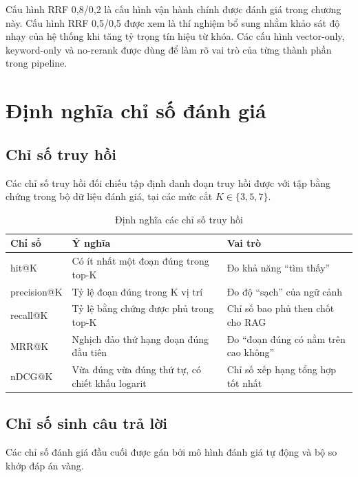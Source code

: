 \documentclass[../DoAn.tex]{subfiles}
\begin{document}
Cấu hình RRF 0,8/0,2 là cấu hình vận hành chính được đánh giá trong chương
này. Cấu hình RRF 0,5/0,5 được xem là thí nghiệm bổ sung nhằm khảo sát độ nhạy
của hệ thống khi tăng tỷ trọng tín hiệu từ khóa. Các cấu hình vector-only,
keyword-only và no-rerank được dùng để làm rõ vai trò của từng thành phần trong
pipeline.

\section{Định nghĩa chỉ số đánh giá}

\subsection{Chỉ số truy hồi}

Các chỉ số truy hồi đối chiếu tập định danh đoạn truy hồi được với tập bằng
chứng trong bộ dữ liệu đánh giá, tại các mức cắt $K \in \{3, 5, 7\}$.

\begin{table}[H]
\centering
\small
\begin{tabular}{|p{2.6cm}|p{4.8cm}|p{6.3cm}|}
\hline
\textbf{Chỉ số} & \textbf{Ý nghĩa} & \textbf{Vai trò} \\
\hline
hit@K & Có ít nhất một đoạn đúng trong top-K & Đo khả năng ``tìm thấy'' \\
\hline
precision@K & Tỷ lệ đoạn đúng trong K vị trí & Đo độ ``sạch'' của ngữ cảnh \\
\hline
recall@K & Tỷ lệ bằng chứng được phủ trong top-K & Chỉ số bao phủ then chốt cho RAG \\
\hline
MRR@K & Nghịch đảo thứ hạng đoạn đúng đầu tiên & Đo ``đoạn đúng có nằm trên cao không'' \\
\hline
nDCG@K & Vừa đúng vừa đúng thứ tự, có chiết khấu logarit & Chỉ số xếp hạng tổng hợp tốt nhất \\
\hline
\end{tabular}
\caption{Định nghĩa các chỉ số truy hồi}
\label{tab:ch6-retrieval-metrics}
\end{table}

\subsection{Chỉ số sinh câu trả lời}

Các chỉ số đánh giá đầu cuối được gán bởi mô hình đánh giá tự động và bộ so khớp đáp án vàng.
\end{document}
